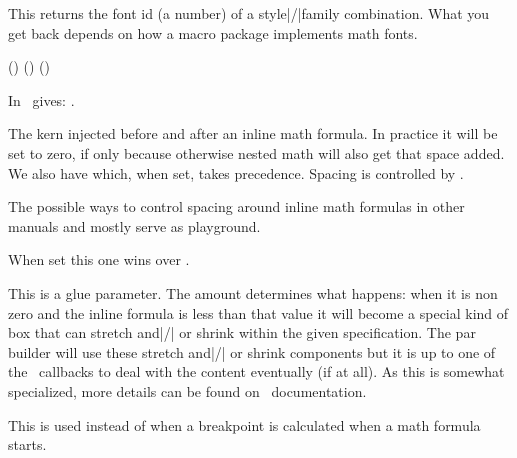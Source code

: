 \stopnewprimitive

\startnewprimitive[title={\prm {mathstylefontid}}]

This returns the font id (a number) of a style|/|family combination. What you get
back depends on how a macro package implements math fonts.

\startbuffer
(\the\mathstylefontid\textstyle        \fam)
(\the\mathstylefontid\scriptstyle      \fam)
(\the\mathstylefontid\scriptscriptstyle\fam)
\stopbuffer

\typebuffer

In \CONTEXT\ gives: \inlinebuffer.

\stopnewprimitive

\startoldprimitive[title={\prm {mathsurround}}]

The kern injected before and after an inline math formula. In practice it will be
set to zero, if only because otherwise nested math will also get that space
added. We also have  which, when set, takes precedence.
Spacing is controlled by .

\stopoldprimitive

\startnewprimitive[title={\prm {mathsurroundmode}}]

The possible ways to control spacing around inline math formulas in other manuals
and mostly serve as playground.

\stopnewprimitive

\startnewprimitive[title={\prm {mathsurroundskip}}]

When set this one wins over .

\stopnewprimitive

\startnewprimitive[title={\prm {maththreshold}}]

This is a glue parameter. The amount determines what happens: when it is non zero
and the inline formula is less than that value it will become a special kind of
box that can stretch and|/| or shrink within the given specification. The par
builder will use these stretch and|/| or shrink components but it is up to one of
the \LUA\ callbacks to deal with the content eventually (if at all). As this is
somewhat specialized, more details can be found on \CONTEXT\ documentation.

\stopnewprimitive

\startnewprimitive[title={\prm {mathtolerance}}]

This is used instead of  when a breakpoint is calculated when a
math formula starts.

